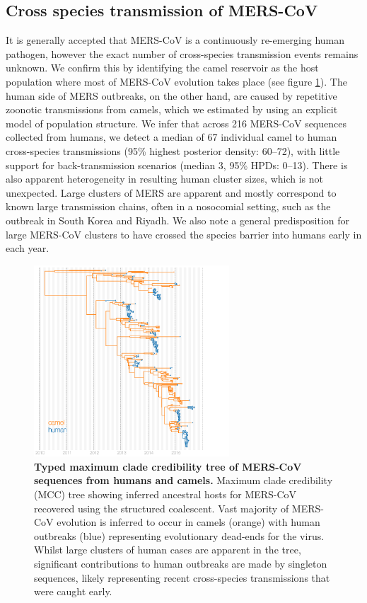 \documentclass[11pt,oneside,letterpaper]{article}
\begin{document}
\subsection*{Cross species transmission of MERS-CoV}
It is generally accepted that MERS-CoV is a continuously re-emerging human pathogen, however the exact number of cross-species transmission events remains unknown.
We confirm this by identifying the camel reservoir as the host population where most of MERS-CoV evolution takes place (see figure \ref{mcc}).
The human side of MERS outbreaks, on the other hand, are caused by repetitive zoonotic transmissions from camels, which we estimated by using an explicit model of population structure.
We infer that across 216 MERS-CoV sequences collected from humans, we detect a median of 67 individual camel to human cross-species transmissions (95\% highest posterior density: 60--72), with little support for back-transmission scenarios (median 3, 95\% HPDs: 0--13).
There is also apparent heterogeneity in resulting human cluster sizes, which is not unexpected.
Large clusters of MERS are apparent and mostly correspond to known large transmission chains, often in a nosocomial setting, such as the outbreak in South Korea and Riyadh.
We also note a general predisposition for large MERS-CoV clusters to have crossed the species barrier into humans early in each year.


\begin{figure}[h]
 \centering		
	\includegraphics[width=0.65\textwidth]{figures/mers_mcc.png}
	\caption{\textbf{Typed maximum clade credibility tree of MERS-CoV sequences from humans and camels.}
	Maximum clade credibility (MCC) tree showing inferred ancestral hosts for MERS-CoV recovered using the structured coalescent.
	Vast majority of MERS-CoV evolution is inferred to occur in camels (orange) with human outbreaks (blue) representing evolutionary dead-ends for the virus.
	Whilst large clusters of human cases are apparent in the tree, significant contributions to human outbreaks are made by singleton sequences, likely representing recent cross-species transmissions that were caught early. 
	}
	\label{mcc}
\end{figure}
\end{document}
